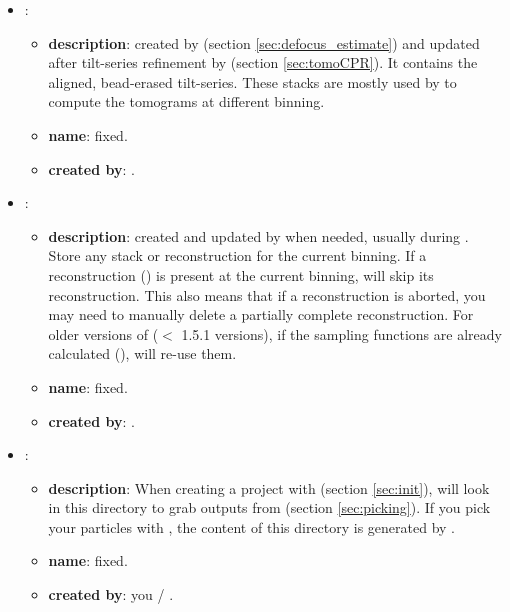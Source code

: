 \begin{itemize}
     \item {}:
     \begin{itemize}
        \item \textbf{description}: created by  (section \ref{sec:defocus_estimate}) and updated after tilt-series refinement by  (section \ref{sec:tomoCPR}). It contains the aligned, bead-erased tilt-series. These stacks are mostly used by  to compute the tomograms at different binning.
        \item \textbf{name}: fixed.
        \item \textbf{created by}: {\emClarity} .
    \end{itemize}

    \item {}:
     \begin{itemize}
        \item \textbf{description}: created and updated by {\emClarity} when needed, usually during . Store any stack or reconstruction for the current binning. If a reconstruction () is present at the current binning,  will skip its reconstruction. This also means that if a reconstruction is aborted, you may need to manually delete a partially complete reconstruction. For older versions of {\emClarity} ($<$ 1.5.1 versions), if the sampling functions are already calculated (), {\emClarity} will re-use them.
        \item \textbf{name}: fixed.
        \item \textbf{created by}: {\emClarity}.
        
    \end{itemize}
    \item {}:
     \begin{itemize}
        \item \textbf{description}: When creating a project with  (section \ref{sec:init}), {\emClarity} will look in this directory to grab outputs from  (section \ref{sec:picking}). If you pick your particles with {\emClarity}, the content of this directory is generated by .
        \item \textbf{name}: fixed.
        \item \textbf{created by}: you / {\emClarity}.
    \end{itemize}


\end{itemize}
